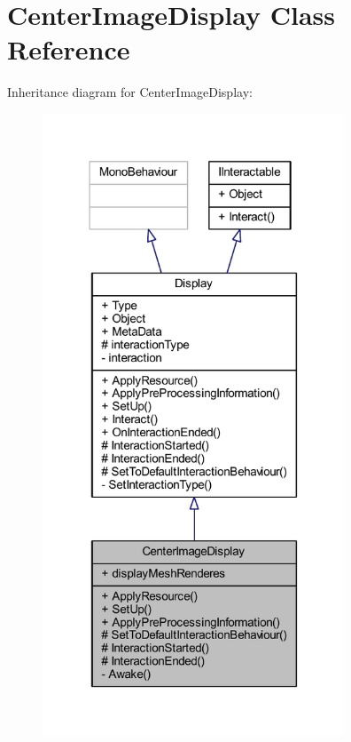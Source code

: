 \hypertarget{class_center_image_display}{}\section{Center\+Image\+Display Class Reference}
\label{class_center_image_display}


Inheritance diagram for Center\+Image\+Display\+:
\nopagebreak
\begin{figure}[H]
\begin{center}
\leavevmode
\includegraphics[width=255pt]{class_center_image_display__inherit__graph}
\end{center}
\end{figure}


